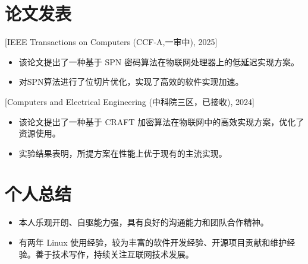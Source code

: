 \documentclass{resume}
\begin{document}
\section{论文发表}

[IEEE Transactions on Computers (CCF-A,一审中), 2025]
\begin{itemize}
  \item 该论文提出了一种基于 SPN 密码算法在物联网处理器上的低延迟实现方案。
  \item 对SPN算法进行了位切片优化，实现了高效的软件实现加速。
\end{itemize}

[Computers and Electrical Engineering (中科院三区，已接收), 2024]
\begin{itemize}
  \item 该论文提出了一种基于 CRAFT 加密算法在物联网中的高效实现方案，优化了资源使用。
  \item 实验结果表明，所提方案在性能上优于现有的主流实现。
\end{itemize}

\section{个人总结}

\begin{itemize}
  \item 本人乐观开朗、自驱能力强，具有良好的沟通能力和团队合作精神。
  \item 有两年 Linux 使用经验，较为丰富的软件开发经验、开源项目贡献和维护经验。善于技术写作，持续关注互联网技术发展。
\end{itemize}
\end{document}
